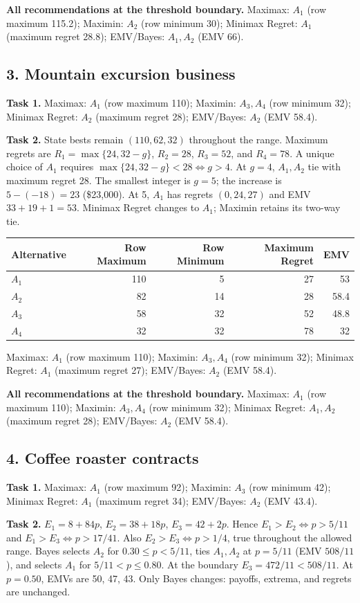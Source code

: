 \textbf{All recommendations at the threshold boundary.} Maximax: $A_1$ (row maximum 115.2); Maximin: $A_2$ (row minimum 30); Minimax Regret: $A_1$ (maximum regret 28.8); EMV/Bayes: $A_1,A_2$ (EMV 66).
\newpage
\subsection*{3. Mountain excursion business}
\textbf{Task 1.} Maximax: $A_1$ (row maximum 110); Maximin: $A_3,A_4$ (row minimum 32); Minimax Regret: $A_2$ (maximum regret 28); EMV/Bayes: $A_2$ (EMV 58.4).

\textbf{Task 2.} State bests remain $(110,62,32)$ throughout the range. Maximum regrets are $R_1=\max\{24,32-g\}$, $R_2=28$, $R_3=52$, and $R_4=78$. A unique choice of $A_1$ requires $\max\{24,32-g\}<28\iff g>4$. At $g=4$, $A_1,A_2$ tie with maximum regret 28. The smallest integer is $g=5$; the increase is $5-(-18)=23$ (\$23,000). At 5, $A_1$ has regrets $(0,24,27)$ and EMV $33+19+1=53$. Minimax Regret changes to $A_1$; Maximin retains its two-way tie.

\begin{center}\begin{tabular}{lrrrr}\toprule Alternative & Row Maximum & Row Minimum & Maximum Regret & EMV\\\midrule
$A_1$ & 110 & 5 & 27 & 53\\
$A_2$ & 82 & 14 & 28 & 58.4\\
$A_3$ & 58 & 32 & 52 & 48.8\\
$A_4$ & 32 & 32 & 78 & 32\\
\bottomrule\end{tabular}\end{center}
Maximax: $A_1$ (row maximum 110); Maximin: $A_3,A_4$ (row minimum 32); Minimax Regret: $A_1$ (maximum regret 27); EMV/Bayes: $A_2$ (EMV 58.4).

\textbf{All recommendations at the threshold boundary.} Maximax: $A_1$ (row maximum 110); Maximin: $A_3,A_4$ (row minimum 32); Minimax Regret: $A_1,A_2$ (maximum regret 28); EMV/Bayes: $A_2$ (EMV 58.4).
\subsection*{4. Coffee roaster contracts}
\textbf{Task 1.} Maximax: $A_1$ (row maximum 92); Maximin: $A_3$ (row minimum 42); Minimax Regret: $A_1$ (maximum regret 34); EMV/Bayes: $A_2$ (EMV 43.4).

\textbf{Task 2.} $E_1=8+84p$, $E_2=38+18p$, $E_3=42+2p$. Hence $E_1>E_2\iff p>5/11$ and $E_1>E_3\iff p>17/41$. Also $E_2>E_3\iff p>1/4$, true throughout the allowed range. Bayes selects $A_2$ for $0.30\leq p<5/11$, ties $A_1,A_2$ at $p=5/11$ (EMV $508/11$), and selects $A_1$ for $5/11<p\leq0.80$. At the boundary $E_3=472/11<508/11$. At $p=0.50$, EMVs are 50, 47, 43. Only Bayes changes: payoffs, extrema, and regrets are unchanged.

